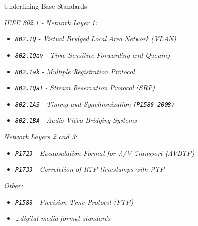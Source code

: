 \documentclass{beamer}
\begin{document}
\begin{frame}{ Underlining Base Standards }

\emph{IEEE 802.1 - Network Layer 1:}

\begin{itemize}

	\item{ \emph{\texttt{802.1Q}} - \emph{Virtual Bridged Local Area Network (VLAN)} }

	\item{ \emph{\texttt{802.1Qav}} - \emph{Time-Sensitive Forwarding and Queuing } }

	\item{ \emph{\texttt{802.1ak}} - \emph{Multiple Registration Protocol } }

	\item{ \emph{\texttt{802.1Qat}} - \emph{Stream Reservation Protocol (SRP) } }

	\item{ \emph{\texttt{802.1AS}} - \emph{Timing and Synchronization \texttt{(P1588-2008)} } }

	\item{ \emph{\texttt{802.1BA}} - \emph{Audio Video Bridging Systems } }

\end{itemize}

\emph{Network Layers 2 and 3:}

\begin{itemize}
	\item{ \emph{\texttt{P1723}} - \emph{Encapsulation Format for A/V Transport (AVBTP) } }
	\item{ \emph{\texttt{P1733}} - \emph{Correlation of RTP timestamps with PTP } }
\end{itemize}

\emph{Other:}

\begin{itemize}
	\item{ \emph{\texttt{P1588}} - \emph{Precision Time Protocol (PTP) } }
	\item{ \emph{\dots digital media format standards} }
\end{itemize}

\end{frame}

\end{document}
